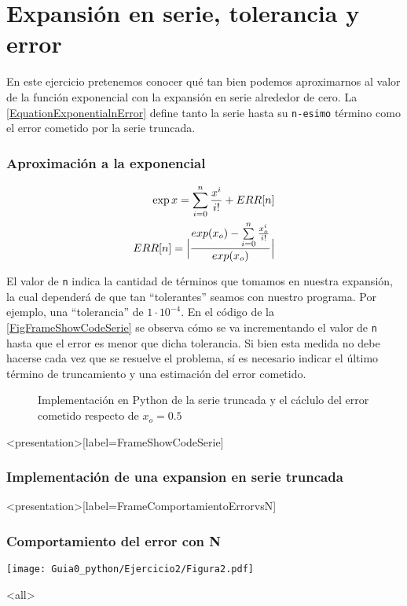\section{Expansión en serie, tolerancia y error}


En este ejercicio pretenemos conocer qué tan bien
podemos aproximarnos al valor de la función exponencial 
con la expansión en serie alrededor de cero.
La \autoref{EquationExponentialnError} define tanto la 
serie hasta su \texttt{n-esimo} término como el error
cometido por la serie truncada. 

\mode*

\begin{frame}[label=FrameEquationExponencial]
  \frametitle<presentation>{Aproximación a la exponencial}

  \begin{equation}\label{EquationExponentialnError}
    \begin{split}
      \exp{x} = \sum_{i=0} ^n \frac{x^i}{i!}+ ERR[n] \\
	ERR [ n ] = \Bigl \vert 
		\frac {exp(x_o) - \sum\limits_{i=0} ^n \frac{x_o^i}{i!} } { exp(x_o) } \Bigr \vert
    \end{split}
  \end{equation}

\end{frame}


El valor de \texttt{n} indica la cantidad de términos que tomamos en 
nuestra expansión, la cual dependerá de que tan ``tolerantes''
seamos con nuestro programa. Por ejemplo, una ``tolerancia'' 
de $1 \cdot 10^{-4} $. En el código de la \autoref{FigFrameShowCodeSerie} 
se observa cómo se va incrementando el valor de \texttt{n}
hasta que el error es menor que dicha tolerancia. Si bien esta 
medida no debe hacerse cada vez que se resuelve el problema, 
sí es necesario indicar el último término de truncamiento 
y una estimación del error cometido. 

\begin{figure}
  \caption{\protect\label{FigFrameShowCodeSerie}
  Implementación en Python de la serie truncada 
  y el cáclulo del error cometido respecto de 
  $x_o = 0.5 $}
\end{figure}
\mode*

\begin{frame}<presentation>[label=FrameShowCodeSerie]
  \frametitle{Implementación de una expansion en serie truncada}

  \begin{codeblock}
     
  \end{codeblock}

\end{frame}

\begin{frame}<presentation>[label=FrameComportamientoErrorvsN]
  \frametitle{Comportamiento del error con N}
  \center
    \texttt{[image: Guia0\_python/Ejercicio2/Figura2.pdf]}

\end{frame}

\mode<all>
